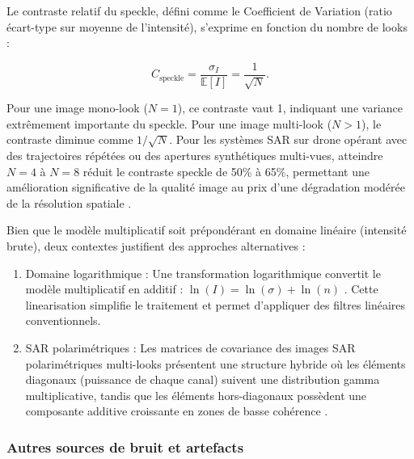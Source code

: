 Le contraste relatif du speckle, défini comme le Coefficient de Variation (ratio écart-type sur moyenne de l'intensité), s'exprime en fonction du nombre de looks \cite{oliver1993enl,mansourpour2006speckle} :

\begin{equation}
C_{\mathrm{speckle}} = \frac{\sigma_I}{\mathbb{E}[I]} = \frac{1}{\sqrt{N}}.
\label{eq:contraste_speckle}
\end{equation}

Pour une image mono-look ($N = 1$), ce contraste vaut 1, indiquant une variance extrêmement importante du speckle. Pour une image multi-look ($N > 1$), le contraste diminue comme $1/\sqrt{N}$. Pour les systèmes SAR sur drone opérant avec des trajectoires répétées ou des apertures synthétiques multi-vues, atteindre $N = 4$ à $N = 8$ réduit le contraste speckle de 50\% à 65\%, permettant une amélioration significative de la qualité image au prix d'une dégradation modérée de la résolution spatiale \cite{lee1994speckle}.


Bien que le modèle multiplicatif soit prépondérant en domaine linéaire (intensité brute), deux contextes justifient des approches alternatives :

\begin{enumerate}
\item Domaine logarithmique : Une transformation logarithmique convertit le modèle multiplicatif en additif : $\ln(I) = \ln(\sigma) + \ln(n)$ \cite{lee1994speckle}. Cette linearisation simplifie le traitement et permet d'appliquer des filtres linéaires conventionnels.

\item SAR polarimétriques : Les matrices de covariance des images SAR polarimétriques multi-looks présentent une structure hybride où les éléments diagonaux (puissance de chaque canal) suivent une distribution gamma multiplicative, tandis que les éléments hors-diagonaux possèdent une composante additive croissante en zones de basse cohérence \cite{lee2003polsar}.
\end{enumerate}

\subsubsection{Autres sources de bruit et artefacts}

